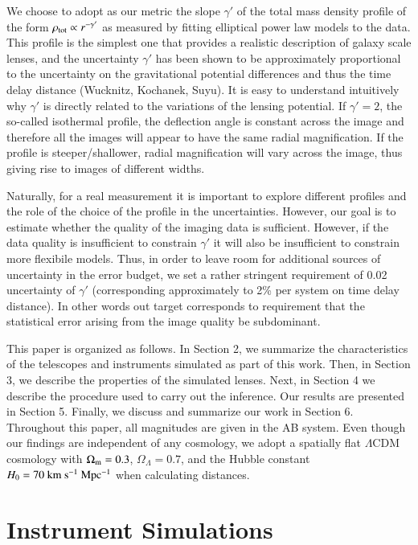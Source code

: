 \documentclass[a4paper,11pt]{article}
\begin{document}
We choose to adopt as our metric the slope $\gamma'$ of the total mass
density profile of the form $\rho_{\rm tot}\propto r^{-\gamma'}$ as
measured by fitting elliptical power law models to the data. This
profile is the simplest one that provides a realistic description of
galaxy scale lenses, and the uncertainty $\gamma'$ has been shown to
be approximately proportional to the uncertainty on the gravitational
potential differences and thus the time delay distance (Wucknitz,
Kochanek, Suyu). It is easy to understand intuitively why $\gamma'$ is
directly related to the variations of the lensing potential. If
$\gamma'=2$, the so-called isothermal profile, the deflection angle is
constant across the image and therefore all the images will appear to
have the same radial magnification. If the profile is
steeper/shallower, radial magnification will vary across the image,
thus giving rise to images of different widths. 

Naturally, for a real measurement it is important to explore different
profiles and the role of the choice of the profile in the
uncertainties. However, our goal is to estimate whether the quality of
the imaging data is sufficient. However, if the data quality is
insufficient to constrain $\gamma'$ it will also be insufficient to
constrain more flexibile models. Thus, in order to leave room for
additional sources of uncertainty in the error budget, we set a rather
stringent requirement of 0.02 uncertainty of $\gamma'$ (corresponding
approximately to 2\% per system on time delay distance). In other
words out target corresponds to requirement that the statistical error
arising from the image quality be subdominant.

This paper is organized as follows. In Section 2, we summarize the
characteristics of the telescopes and instruments simulated as part of
this work. Then, in Section 3, we describe the properties of the
simulated lenses. Next, in Section 4 we describe the procedure used to
carry out the inference.  Our results are presented in Section
5. Finally, we discuss and summarize our work in Section 6. Throughout
this paper, all magnitudes are given in the AB system. Even though our
findings are independent of any cosmology, we adopt a spatially flat
$\Lambda$CDM cosmology with $\Omega_{\rm{m}} = 0.3$, $\Omega_{\Lambda}
= 0.7$, and the Hubble constant $H_{0} = 70~\rm km~s^{-1}~Mpc^{-1}$
when calculating distances.

\section{Instrument Simulations}
\end{document}
